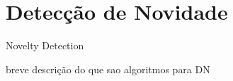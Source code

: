 





\section{Detecção de Novidade}

Novelty Detection

breve descrição do que sao algoritmos para DN

\cite{Costa2019thesis}

